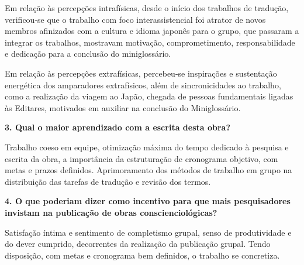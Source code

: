 \documentclass{gescons}
\begin{document}
\begin{multicols}{2}
Em relação às percepções intrafísicas, desde o início dos trabalhos de tradução, verificou-se que o trabalho com foco interassistencial foi atrator de novos membros afinizados com a cultura e idioma japonês para o grupo, que passaram a integrar os trabalhos, mostravam motivação, comprometimento, responsabilidade e dedicação para a conclusão do miniglossário.

Em relação às percepções extrafísicas, percebeu-se inspirações e sustentação energética dos amparadores extrafísicos, além de sincronicidades ao trabalho, como a realização da viagem ao Japão, chegada de pessoas fundamentais ligadas às Editares, motivados em auxiliar na conclusão do Miniglossário.

\textbf{3. Qual o maior aprendizado com a escrita desta obra?}

Trabalho coeso em equipe, otimização máxima do tempo dedicado à pesquisa e escrita da obra, a importância da estruturação de cronograma objetivo, com metas e prazos definidos. Aprimoramento dos métodos de trabalho em grupo na distribuição das tarefas de tradução e revisão dos termos.


\textbf{4. O que poderiam dizer como incentivo para que mais pesquisadores invistam na publicação de obras conscienciológicas?}

Satisfação íntima e sentimento de completismo grupal, senso de produtividade e do dever cumprido, decorrentes da realização da publicação grupal. Tendo disposição, com metas e cronograma bem definidos, o trabalho se concretiza.

    \end{multicols}
\end{document}
